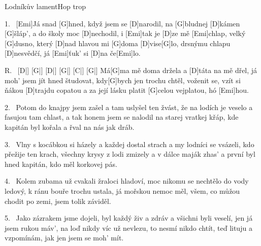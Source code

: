 \begin{song}{Lodníkův lament}{Hop trop}

\begin{xverse}{1.~}
[Emi]Já snad [G]hned, když jsem se [D]narodil,
na [G]bludnej [D]kámen [G]{šláp'},
a do školy moc [D]nechodil, i [Emi]tak je [D]ze mě [Emi]chlap,
velký [G]dusno, který [D]nad hlavou mi [G]doma [D]vise[G]lo,
drsnýmu chlapu [D]nesvědčí,
já [Emi]{ťuk'} si [D]na če[Emi]lo.
\end{xverse}


\begin{xverse}{R.~}
[D|]{} [G|]{} [D|]{} [G|]{} [C|]{} [G|]{}
Má[G]ma mě doma držela a [D]táta na mě dřel,
já moh' jsem jít hned študovat, kdy[G]bych jen trochu chtěl,
voženit se, vzít si ňákou [D]trajdu copatou
a za její lásku platit [G]celou vejplatou, hó [Emi]hou.
\end{xverse}


\begin{xverse}{2.~}
Potom do knajpy jsem zašel a tam uslyšel ten žvást,
že na lodích je veselo a fasujou tam chlast,
a tak honem jsem se nalodil na starej vratkej křáp,
kde kapitán byl kořala a řval na nás jak dráb.
\end{xverse}


\begin{xverse}{3.~}
Vlny s kocábkou si házely a každej dostal strach
a my lodníci se vsázeli, kdo přežije ten krach,
všechny krysy z lodi zmizely a v dálce maják zhas'
a první byl hned kapitán, kdo měl korkovej pás.
\end{xverse}


\begin{xverse}{4.~}
Kolem zubama už cvakali žraloci hladoví,
moc nikomu se nechtělo do vody ledový,
k ránu bouře trochu ustala, já mořskou nemoc měl,
všem, co můžou chodit po zemi, jsem tolik záviděl.
\end{xverse}

\begin{xverse}{5.~}
Jako zázrakem jsme dojeli, byl každý živ a zdráv
a všichni byli veselí, jen já jsem rukou máv',
na loď nikdy víc už nevlezu, to nesmí nikdo chtít,
teď lituju a vzpomínám, jak jen jsem se moh' mít.
\end{xverse}

\end{song}

